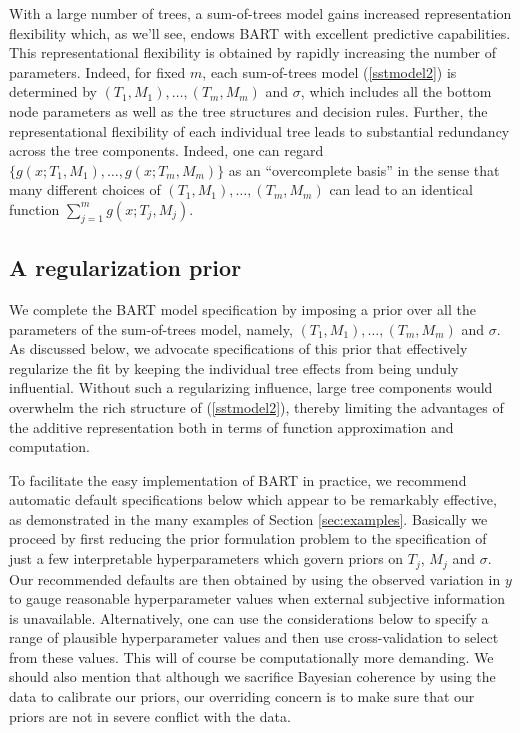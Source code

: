 \documentclass[aoas,nameyear,dvips]{arximspdf}
\begin{document}
With a large number of trees, a sum-of-trees model gains increased
representation flexibility which, as we'll see, endows BART with
excellent predictive capabilities.    This
representational flexibility is obtained by rapidly increasing the
number of parameters. Indeed, for fixed $m$, each sum-of-trees model
(\ref{sstmodel2}) is determined by $(T_1,M_1),\ldots,(T_m,M_m)$ and
$\sigma$, which includes all the bottom node parameters as well as
the tree structures and decision rules.  Further, the
representational flexibility of each individual tree leads to
substantial redundancy across the tree components. Indeed, one can
regard $\{g(x; T_1,M_1),
 \ldots , g(x; T_m,M_m)\}$ as an ``overcomplete
basis'' in the sense that many different choices of $(T_1,M_1),\ldots,(T_m,M_m)$ can lead to an identical function $\sum_{j=1}^m g(x; T_j,M_j)$.

\subsection{A regularization prior} \label{sec:prior}

We complete the BART model specification by imposing a prior over all
the parameters of the sum-of-trees model, namely,
$(T_1,M_1),\ldots,(T_m,M_m)$ and $\sigma$.   As discussed below, we
advocate specifications of this prior that effectively regularize the
fit  by keeping the individual tree effects from being unduly
influential.   Without such a regularizing influence, large tree
components would overwhelm the rich structure of (\ref{sstmodel2}),
thereby limiting the advantages of the additive representation both in
terms of function approximation and computation.

To facilitate the easy implementation of BART in practice, we recommend
automatic default specifications below which appear to be remarkably
effective, as demonstrated in the many examples of Section
\ref{sec:examples}.  Basically we proceed by first reducing the prior
formulation problem to the specification of just a few interpretable
hyperparameters which govern priors on $T_j$, $M_j$ and $\sigma$.  Our
recommended defaults are then obtained by using the observed variation
in $y$ to gauge reasonable hyperparameter values when external
subjective information is unavailable.  Alternatively, one can use the
considerations below to specify a range of plausible hyperparameter
values and then use cross-validation to select from these values.  This
will of course be computationally more demanding.  We should also
mention that although we sacrifice Bayesian coherence by using the data
to calibrate our priors, our overriding concern is to make sure that
our priors are not in severe conflict with the data.
\end{document}
